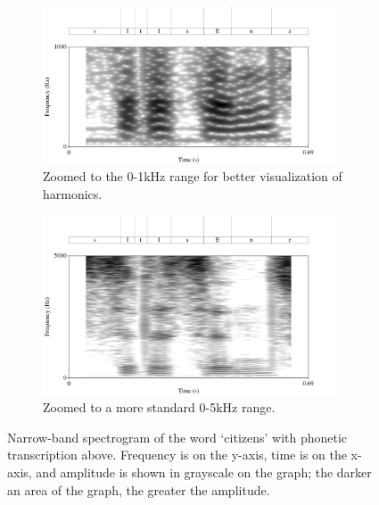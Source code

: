 \begin{figure}[h!]
\begin{subfigure}{0.95\textwidth}
  \centering
  \includegraphics[width=0.95\textwidth]{figure/spctgrm1k.png}
  \caption{Zoomed to the 0-1kHz range for better visualization of harmonics.}
  \label{fig:spctgrm_citizen_1k}
\end{subfigure}%
\hfill
\begin{subfigure}{0.95\textwidth}
  \centering
  \includegraphics[width=0.95\textwidth]{figure/spctgrm5k.png}
  \caption{Zoomed to a more standard 0-5kHz range.}
  \label{fig:spctgrm_citizen_5k}
\end{subfigure}
\caption{Narrow-band spectrogram of the word `citizens' with phonetic transcription above.  Frequency is on the y-axis, time is on the x-axis, and amplitude is shown in grayscale on the graph; the darker an area of the graph, the greater the amplitude.}
\label{fig:spctgrm_citizen}
\end{figure}

